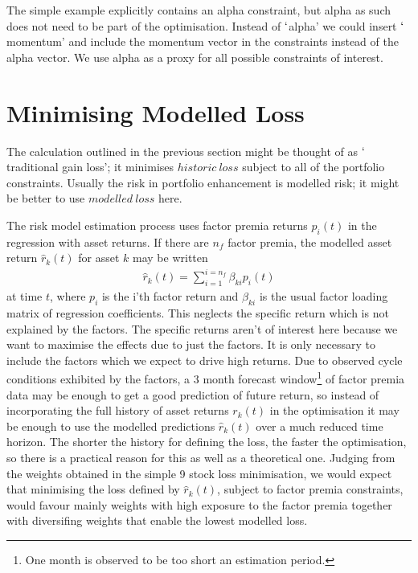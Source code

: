 \documentclass[12pt]{article}
\begin{document}
The simple example explicitly contains an alpha constraint, but alpha as such does not need to 
be part of the optimisation. Instead of $`$alpha' we could insert $`$momentum' and include the momentum 
vector in the constraints instead of the alpha vector. We use alpha as a proxy for all 
possible constraints of interest.
\section{Minimising Modelled Loss}
The calculation outlined in the previous section might be thought of as $`$traditional gain loss'; it
minimises $historic\ loss$ subject to all of the portfolio constraints. Usually the risk in 
portfolio enhancement is modelled risk; it might be better to use $modelled\ loss$ here.

The risk model estimation process uses factor premia returns $p_{i}(t)$ in the regression
with asset returns. If there are $n_f$ factor premia, the modelled asset return $\hat{r}_{k}(t)$ for asset $k$ may be written
\begin{eqnarray}
    \hat{r}_{k}(t) = \sum_{i=1}^{i=n_f}\beta_{ki} p_{i}(t)
\end{eqnarray}
at time $t$, where $p_i$ is the i'th factor return and $\beta_{ki}$ is the usual factor loading matrix of regression coefficients.
This neglects the specific return which is not explained by the factors. The specific returns aren't of interest here because we want 
to maximise the effects due to just the factors. It is only necessary to include the factors which we expect 
to drive high returns.
Due to observed cycle conditions exhibited by the factors, a 3 month forecast window\footnote{One month is observed to be too short an estimation period.} of factor premia data may be enough
to get a good prediction of future return, so instead of incorporating the full history of
asset returns $r_k(t)$ in the optimisation it may be enough to use the modelled predictions
$\hat{r}_{k}(t)$ over a much reduced time horizon. The shorter the history for defining the
loss, the faster the optimisation, so there is a practical reason for this as well as
a theoretical one. Judging from the weights obtained in the simple 9 stock loss minimisation, we would expect 
that minimising the loss defined by $\hat{r}_{k}(t)$, subject to factor premia constraints, would favour mainly weights 
with high exposure to the factor premia together with diversifing weights that enable the lowest modelled loss.
\end{document}
